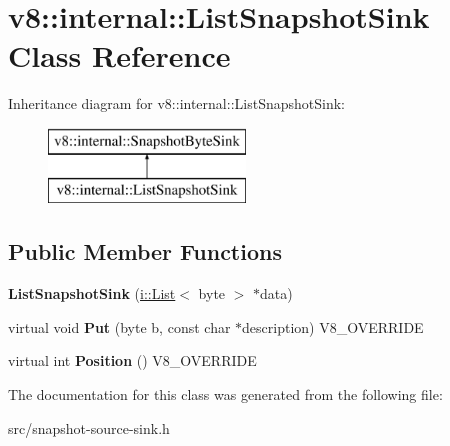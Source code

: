 \hypertarget{classv8_1_1internal_1_1_list_snapshot_sink}{}\section{v8\+:\+:internal\+:\+:List\+Snapshot\+Sink Class Reference}
\label{classv8_1_1internal_1_1_list_snapshot_sink}
Inheritance diagram for v8\+:\+:internal\+:\+:List\+Snapshot\+Sink\+:\begin{figure}[H]
\begin{center}
\leavevmode
\includegraphics[height=2.000000cm]{classv8_1_1internal_1_1_list_snapshot_sink}
\end{center}
\end{figure}
\subsection*{Public Member Functions}
\begin{DoxyCompactItemize}
\item 
\hypertarget{classv8_1_1internal_1_1_list_snapshot_sink_aeecd40b9d979085fd6ca536932eb8c6d}{}{\bfseries List\+Snapshot\+Sink} (\hyperlink{classv8_1_1internal_1_1_list}{i\+::\+List}$<$ byte $>$ $\ast$data)\label{classv8_1_1internal_1_1_list_snapshot_sink_aeecd40b9d979085fd6ca536932eb8c6d}

\item 
\hypertarget{classv8_1_1internal_1_1_list_snapshot_sink_ae71efe078d826cb3381847e410f758cf}{}virtual void {\bfseries Put} (byte b, const char $\ast$description) V8\+\_\+\+O\+V\+E\+R\+R\+I\+D\+E\label{classv8_1_1internal_1_1_list_snapshot_sink_ae71efe078d826cb3381847e410f758cf}

\item 
\hypertarget{classv8_1_1internal_1_1_list_snapshot_sink_a943f0851fbd663f9ec4597fe77ef3550}{}virtual int {\bfseries Position} () V8\+\_\+\+O\+V\+E\+R\+R\+I\+D\+E\label{classv8_1_1internal_1_1_list_snapshot_sink_a943f0851fbd663f9ec4597fe77ef3550}

\end{DoxyCompactItemize}


The documentation for this class was generated from the following file\+:\begin{DoxyCompactItemize}
\item 
src/snapshot-\/source-\/sink.\+h\end{DoxyCompactItemize}
